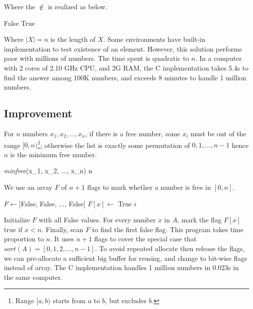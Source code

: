 \documentclass[b5paper]{article}
\begin{document}
Where the $\notin$ is realized as below.

\begin{algorithmic}[1]
      \State \Return False
    \EndIf
  \EndFor
  \State \Return True
\EndFunction
\end{algorithmic}

Where $|X| = n$ is the length of $X$. Some environments have built-in implementation to test existence of an element. However, this solution performs poor with millions of numbers. The time spent is quadratic to $n$. In a computer with 2 cores of 2.10 GHz CPU, and 2G RAM, the C implementation takes 5.4s to find the answer among 100K numbers, and exceeds 8 minutes to handle 1 million numbers.

\subsection*{Improvement}
For $n$ numbers $x_1, x_2, ..., x_n$, if there is a free number, some $x_i$ must be out of the range $[0, n)$\footnote{Range $[a, b)$ starts from $a$ to $b$, but excludes $b$.}; otherwise the list is exactly some permutation of $0, 1, ..., n - 1$ hence $n$ is the minimum free number.

\be
\textit{minfree}(x_1, x_2, ..., x_n) \leq n
\label{eq:min-free}
\ee

We use an array $F$ of $n + 1$ flags to mark whether a number is free in $[0, n]$.

\begin{algorithmic}[1]
  \State $F \gets $[False, False, ..., False] 
      \State $F[x] \gets$ True
    \EndIf
  \EndFor
      \State \Return $i$
    \EndIf
  \EndFor
\EndFunction
\end{algorithmic}

Initialize $F$ with all False values. For every number $x$ in $A$, mark the flag $F[x]$ true if $x < n$. Finally, scan $F$ to find the first false flag. This program takes time proportion to $n$. It uses $n + 1$ flags to cover the special case that $sort(A) = [0, 1, 2, ..., n-1]$. To avoid repeated allocate then release the flags, we can pre-allocate a sufficient big buffer for reusing, and change to bit-wise flags instead of array. The C implementation handles 1 million numbers in 0.023s in the same computer.

\end{document}
